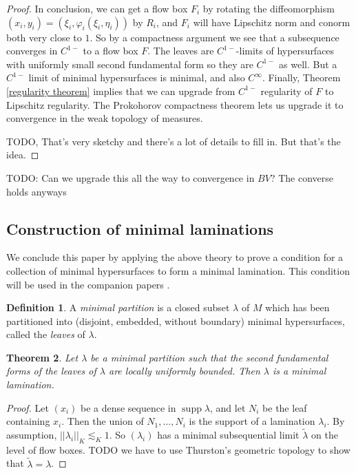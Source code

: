 \documentclass[reqno,10pt]{amsart}
\DeclareMathOperator{\supp}{supp}
\newcommand{\dfn}[1]{\emph{#1}\index{#1}}
\newtheorem{theorem}{Theorem}[section]
\theoremstyle{definition}
\newtheorem{definition}[theorem]{Definition}
\numberwithin{equation}{section}
\begin{document}
\begin{proof}
In conclusion, we can get a flow box $F_i$ by rotating the diffeomorphism $(x_i, y_i) = (\xi_i, \varphi_i(\xi_i, \eta_i))$ by $R_i$, and $F_i$ will have Lipschitz norm and conorm both very close to $1$.
So by a compactness argument we see that a subsequence converges in $C^{1-}$ to a flow box $F$.
The leaves are $C^{1-}$-limits of hypersurfaces with uniformly small second fundamental form so they are $C^{1-}$ as well.
But a $C^{1-}$ limit of minimal hypersurfaces is minimal, and also $C^\infty$.
Finally, Theorem \ref{regularity theorem} implies that we can upgrade from $C^{1-}$ regularity of $F$ to Lipschitz regularity.
The Prokohorov compactness theorem lets us upgrade it to convergence in the weak topology of measures.

TODO, That's very sketchy and there's a lot of details to fill in. But that's the idea.
\end{proof}

TODO: Can we upgrade this all the way to convergence in $BV$?
The converse holds anyways



\subsection{Construction of minimal laminations}
We conclude this paper by applying the above theory to prove a condition for a collection of minimal hypersurfaces to form a minimal lamination.
This condition will be used in the companion papers \cite{BackusFLG, DaskalopoulosPrep2}.

\begin{definition}
A \dfn{minimal partition} is a closed subset $\lambda$ of $M$ which has been partitioned into (disjoint, embedded, without boundary) minimal hypersurfaces, called the \dfn{leaves} of $\lambda$.
\end{definition}

\begin{theorem}
Let $\lambda$ be a minimal partition such that the second fundamental forms of the leaves of $\lambda$ are locally uniformly bounded.
Then $\lambda$ is a minimal lamination.
\end{theorem}
\begin{proof}
Let $(x_i)$ be a dense sequence in $\supp \lambda$, and let $N_i$ be the leaf containing $x_i$.
Then the union of $N_1, \dots, N_i$ is the support of a lamination $\lambda_i$.
By assumption, $||\lambda_i||_K \lesssim_K 1$.
So $(\lambda_i)$ has a minimal subsequential limit $\tilde \lambda$ on the level of flow boxes.
TODO we have to use Thurston's geometric topology to show that $\tilde \lambda = \lambda$.
\end{proof}
\end{document}
